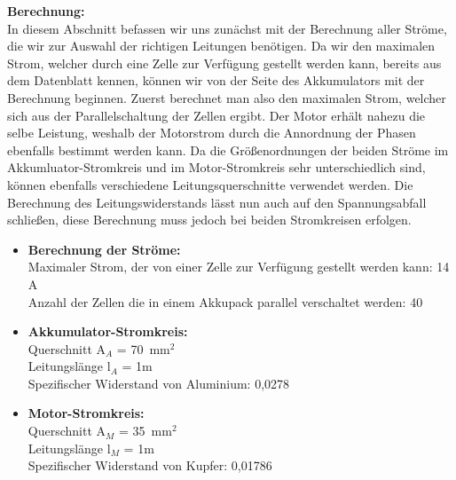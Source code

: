\textbf{Berechnung:} 
\\[2mm]
In diesem Abschnitt befassen wir uns zunächst mit der Berechnung aller Ströme, die wir zur Auswahl der richtigen Leitungen benötigen. Da wir den maximalen Strom, welcher durch eine Zelle zur Verfügung gestellt werden kann, bereits aus dem Datenblatt kennen, können wir von der Seite des Akkumulators mit der Berechnung beginnen. Zuerst berechnet man also den maximalen Strom, welcher sich aus der Parallelschaltung der Zellen ergibt. Der Motor erhält nahezu die selbe Leistung, weshalb der Motorstrom durch die Annordnung der Phasen ebenfalls bestimmt werden kann. Da die Größenordnungen der beiden Ströme im Akkumluator-Stromkreis und im Motor-Stromkreis sehr unterschiedlich sind, können ebenfalls verschiedene Leitungsquerschnitte verwendet werden. Die Berechnung des Leitungswiderstands lässt nun auch auf den Spannungsabfall schließen, diese Berechnung muss jedoch bei beiden Stromkreisen erfolgen.\\[6mm]
\begin{itemize}
	\item \textbf{Berechnung der Ströme:}
	\\[1mm] Maximaler Strom, der von einer Zelle zur Verfügung gestellt werden kann: 14 A 
	\\ Anzahl der Zellen die in einem Akkupack parallel verschaltet werden: 40 \\[3mm]
	\item \textbf{Akkumulator-Stromkreis:} 
	\\[1mm] Querschnitt    A$_A$ =  70~mm$^2$
	\\ Leitungslänge  l$_A$ =  1m  		
	\\ Spezifischer Widerstand von Aluminium: 	0,0278 \\[3mm]
	\item \textbf{Motor-Stromkreis:}
	\\[1mm] Querschnitt    A$_M$ =  35~mm$^2$
	\\ Leitungslänge  l$_M$ =  1m  		
	\\ Spezifischer Widerstand von Kupfer:		0,01786
\end{itemize}

